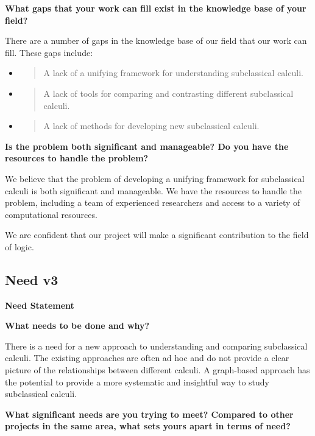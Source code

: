 \textbf{What gaps that your work can fill exist in the knowledge base of
your field?}

There are a number of gaps in the knowledge base of our field that our
work can fill. These gaps include:

\begin{itemize}
\item
  \begin{quote}
  A lack of a unifying framework for understanding subclassical calculi.
  \end{quote}
\item
  \begin{quote}
  A lack of tools for comparing and contrasting different subclassical
  calculi.
  \end{quote}
\item
  \begin{quote}
  A lack of methods for developing new subclassical calculi.
  \end{quote}
\end{itemize}

\textbf{Is the problem both significant and manageable? Do you have the
resources to handle the problem?}

We believe that the problem of developing a unifying framework for
subclassical calculi is both significant and manageable. We have the
resources to handle the problem, including a team of experienced
researchers and access to a variety of computational resources.

We are confident that our project will make a significant contribution
to the field of logic.

\hypertarget{need-v3}{%
\subsection{Need v3}\label{need-v3}}

\textbf{Need Statement}

\textbf{What needs to be done and why?}

There is a need for a new approach to understanding and comparing
subclassical calculi. The existing approaches are often ad hoc and do
not provide a clear picture of the relationships between different
calculi. A graph-based approach has the potential to provide a more
systematic and insightful way to study subclassical calculi.

\textbf{What significant needs are you trying to meet? Compared to other
projects in the same area, what sets yours apart in terms of need?}

